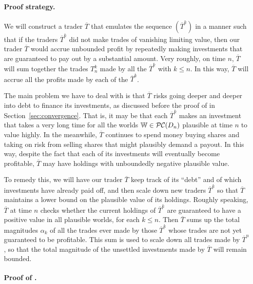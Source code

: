 \documentclass[authordate,onecolumn,noenvironments]{miri-tech-article}
\numberwithin{equation}{subsection}
\newcommand{\seq}[1]{{\overline{#1}}}
\newcommand{\nn}{n}
\newcommand{\trade}{T}%
\newcommand{\Trader}{\seq{\trade}} %
\newcommand{\dt}{D}
\newcommand{\pcworlds}{\mathcal{P\-C}}
\newcommand{\World}{\mathbb{W}}
\begin{document}


\paragraph{Proof strategy.}
We will construct a trader $\Trader$ that emulates the sequence $(\Trader^k)$ in a manner such that if the traders $\Trader^k$ did not make trades of
vanishing limiting value, then our trader $\Trader$ would accrue unbounded profit by repeatedly making investments that are guaranteed to pay out by a substantial amount. 
Very roughly, on time $n$, $\Trader$ will sum together the trades $\trade^k_n$ made by all the $\Trader^k$ with $k\le n$. In this way, $\Trader$ will accrue all the profits made by each of the $\Trader^k$. 


The main problem we have to deal with is that $\Trader$ risks going deeper and deeper into debt to finance its investments, as discussed before the proof of  in Section~\ref{sec:convergence}. That is, it may be that each
$\Trader^k$ makes an investment that takes a very long time for all the worlds
$\World\in\pcworlds(\dt_\nn)$ plausible at time $n$ to value highly. In the meanwhile, $\Trader$ continues to spend money buying shares and taking on risk 
from selling shares that might plausibly demand a payout. 
In this way, despite the fact that each of its investments will eventually become profitable, $\Trader$ may have holdings with unboundedly negative plausible
value. 

To remedy this, we will have  our trader $\Trader$ keep track of its 
``debt'' and of which investments have already paid off, and then scale down new traders $\Trader^k$ so that $\Trader$ maintains a lower bound on the plausible value of
its holdings.  Roughly speaking, $\Trader$ at time $n$ checks whether the current holdings of $\Trader^k$ are guaranteed to have a positive value in all
plausible worlds, for each $k\le n$. Then $\Trader$ sums up the total magnitudes $\alpha_k$ of all the trades ever made by those $\Trader^k$ whose trades are not yet guaranteed to be profitable. This sum is used to scale down all trades made by $\Trader^n$, so that the total magnitude of the unsettled investments made by $\Trader$ will remain bounded. 



\paragraph{Proof of .}
\end{document}
